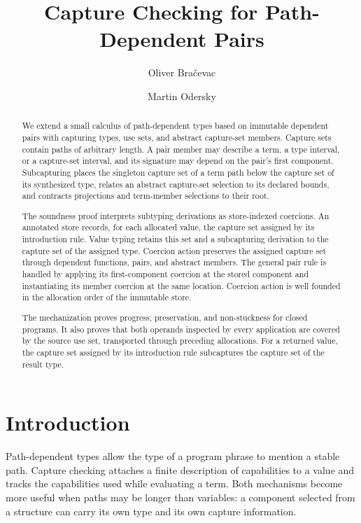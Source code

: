 \documentclass[acmsmall,screen,nonacm]{acmart}
\title{Capture Checking for Path-Dependent Pairs}
\author{Oliver Bra\v{c}evac}
\author{Martin Odersky}
\begin{document}
\begin{abstract}
We extend a small calculus of path-dependent types based on immutable
dependent pairs with capturing types, use sets, and abstract capture-set
members. Capture sets contain paths of arbitrary length. A pair member may
describe a term, a type interval, or a capture-set interval, and its signature
may depend on the pair's first component. Subcapturing places the singleton
capture set of a term path below the capture set of its synthesized type, relates an
abstract capture-set selection to its declared bounds, and contracts
projections and term-member selections to their root.

The soundness proof interprets subtyping derivations as store-indexed
coercions. An annotated store records, for each allocated value, the capture
set assigned by its introduction rule. Value typing retains this set
and a subcapturing derivation to the capture set of the assigned type.
Coercion action preserves the assigned capture set through dependent functions,
pairs, and abstract members. The general pair rule is handled by applying its first-component
coercion at the stored component and instantiating its member coercion at the
same location. Coercion action is well founded in the allocation order of
the immutable store.

The mechanization proves progress, preservation, and non-stuckness for
closed programs.  It also proves that both operands inspected by every
application are covered by the source use set, transported through preceding
allocations. For a returned value, the capture set assigned by its
introduction rule subcaptures the capture set of the result type.
\end{abstract}


\maketitle

\section{Introduction}

Path-dependent types allow the type of a program phrase to mention a stable
path. Capture checking attaches a finite description of capabilities to a
value and tracks the capabilities used while evaluating a term. Both
mechanisms become more useful when paths may be longer than variables: a
component selected from a structure can carry its own type and its own
capture information.
\end{document}
